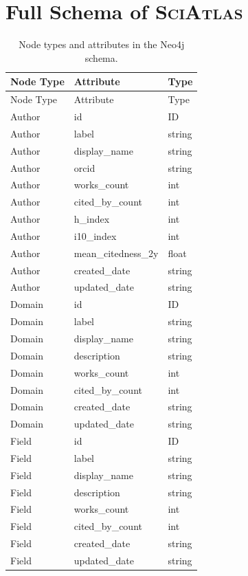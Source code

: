 \documentclass{llmxive}
\providecommand{\ours}{\textsc{SciAtlas}}
\begin{document}
\section{Full Schema of {\ours}}
\label{app:schema}
\begin{longtable}{p{2.8cm}p{5.5cm}p{3cm}}
\caption{Node types and attributes in the Neo4j schema.}
\label{tab:node-attributes} \\

\toprule
Node Type & Attribute & Type \\
\midrule
\endfirsthead

\toprule
Node Type & Attribute & Type \\
\midrule
\endhead

\bottomrule
\endfoot

Author & id & ID \\
Author & label & string \\
Author & display\_name & string \\
Author & orcid & string \\
Author & works\_count & int \\
Author & cited\_by\_count & int \\
Author & h\_index & int \\
Author & i10\_index & int \\
Author & mean\_citedness\_2y & float \\
Author & created\_date & string \\
Author & updated\_date & string \\

Domain & id & ID \\
Domain & label & string \\
Domain & display\_name & string \\
Domain & description & string \\
Domain & works\_count & int \\
Domain & cited\_by\_count & int \\
Domain & created\_date & string \\
Domain & updated\_date & string \\

Field & id & ID \\
Field & label & string \\
Field & display\_name & string \\
Field & description & string \\
Field & works\_count & int \\
Field & cited\_by\_count & int \\
Field & created\_date & string \\
Field & updated\_date & string \\


\end{longtable}
\end{document}
